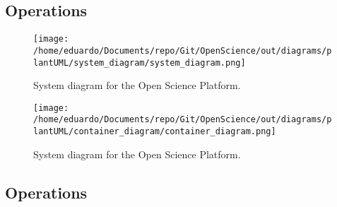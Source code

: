\documentclass{article}
\begin{document}
\subsection{Operations}


\vspace{1cm}

\begin{figure}[H]
    \centering
    \texttt{[image: /home/eduardo/Documents/repo/Git/OpenScience/out/diagrams/plantUML/system\_diagram/system\_diagram.png]}  %
    \caption{System diagram for the Open Science Platform.}
    \label{fig:system-diagram}
\end{figure}


\vspace{1cm}

\begin{figure}[H]
    \centering
    \texttt{[image: /home/eduardo/Documents/repo/Git/OpenScience/out/diagrams/plantUML/container\_diagram/container\_diagram.png]}  %
    \caption{System diagram for the Open Science Platform.}
    \label{fig:container-diagram}
\end{figure}


\subsection{Operations}
\end{document}
